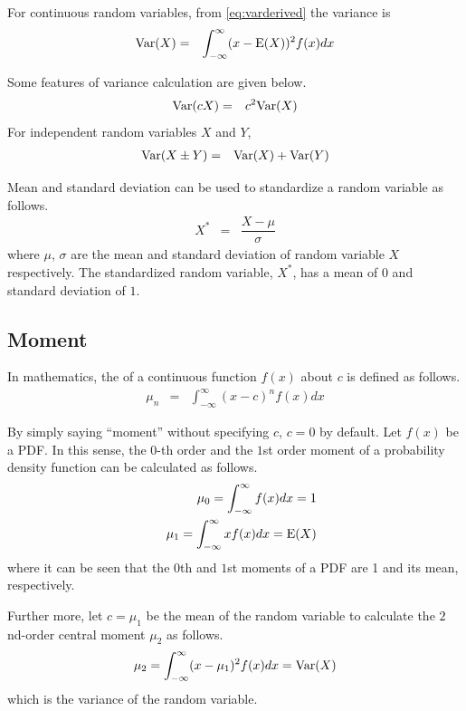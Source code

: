 For continuous random variables, from \eqref{eq:varderived} the variance is
\begin{eqnarray}
	\textup{Var}(X) &=& \int_{-\infty}^{\infty} (x-\textup{E}(X))^2f(x)dx \nonumber
\end{eqnarray}

Some features of variance calculation are given below.
\begin{eqnarray}
	\textup{Var}(cX) &=& c^2\textup{Var}(X) \nonumber
\end{eqnarray}
For independent random variables $X$ and $Y$,
\begin{eqnarray}
	\textup{Var}(X\pm Y) &=& \textup{Var}(X) + \textup{Var}(Y) \nonumber
\end{eqnarray}

Mean and standard deviation can be used to standardize a random variable as follows.
\begin{eqnarray}
	X^* &=& \dfrac{X-\mu}{\sigma} \nonumber
\end{eqnarray}
where $\mu$, $\sigma$ are the mean and standard deviation of random variable $X$ respectively. The standardized random variable, $X^*$, has a mean of $0$ and standard deviation of $1$.

\subsection{Moment} \label{sec:moments}

In mathematics, the  of a continuous function $f(x)$ about $c$ is defined as follows.
\begin{eqnarray}
	\mu_n &=& \int_{-\infty}^{\infty}(x-c)^nf(x)dx \nonumber
\end{eqnarray}

By simply saying ``moment'' without specifying $c$, $c=0$ by default. Let $f(x)$ be a PDF. In this sense, the $0$-th order and the $1$st order moment of a probability density function can be calculated as follows.
\begin{eqnarray}
	&& \mu_0 = \int_{-\infty}^{\infty}f(x)dx = 1 \nonumber \\
	&& \mu_1 = \int_{-\infty}^{\infty}xf(x)dx = \textup{E}(X) \nonumber
\end{eqnarray}
where it can be seen that the $0$th and $1$st moments of a PDF are 1 and its mean, respectively.

Further more, let $c=\mu_1$ be the mean of the random variable to calculate the $2$nd-order central moment $\mu_2$ as follows.
\begin{eqnarray}
	\mu_2 = \int_{-\infty}^{\infty}(x-\mu_1)^2f(x)dx = \textup{Var}(X) \nonumber
\end{eqnarray}
which is the variance of the random variable.

